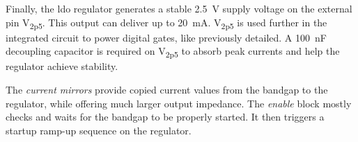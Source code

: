 Finally, the \gls{ldo} regulator generates a stable \SI{2.5}{\volt} supply voltage on the external pin V\textsubscript{2p5}.
This output can deliver up to \SI{20}{\milli\ampere}.
V\textsubscript{2p5} is used further in the integrated circuit to power digital gates, like previously detailed.
A \SI{100}{\nano\farad} decoupling capacitor is required on V\textsubscript{2p5} to absorb peak currents and help the regulator achieve stability.

The \textit{current mirrors} provide copied current values from the bandgap to the regulator, while offering much larger output impedance.
The \textit{enable} block mostly checks and waits for the bandgap to be properly started.
It then triggers a startup ramp-up sequence on the regulator.
